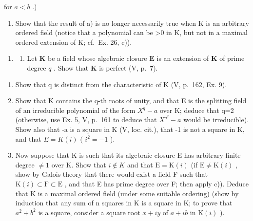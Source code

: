 for \(a < b\) .)

\begin{enumerate}
\def\labelenumi{\alph{enumi})}
\setcounter{enumi}{1}
\tightlist
\item
  Show that the result of a) is no longer necessarily true when K is an arbitrary ordered field (notice that a polynomial can be \textgreater0 in K, but not in a maximal ordered extension of K; cf.~Ex. 26, c)).
\end{enumerate}

\begin{enumerate}
\def\labelenumi{\arabic{enumi})}
\setcounter{enumi}{30}
\tightlist
\item
  \begin{enumerate}
  \def\labelenumii{\alph{enumii})}
  \tightlist
  \item
    Let \(\mathbf{K}\) be a field whose algebraic closure \(\mathbf{E}\) is an extension of \(\mathbf{K}\) of prime degree \(q\) . Show that \(\mathbf{K}\) is perfect (V, p.~7).
  \end{enumerate}
\end{enumerate}

\begin{enumerate}
\def\labelenumi{\alph{enumi})}
\setcounter{enumi}{1}
\item
  Show that q is distinct from the characteristic of K (V, p.~162, Ex. 9).
\item
  Show that K contains the q-th roots of unity, and that E is the splitting field of an irreducible polynomial of the form \(X^{q}-a\) over K; deduce that q=2 (otherwise, use Ex. 5, V, p.~161 to deduce that \(X^{q^{2}}-a\) would be irreducible). Show also that -a is a square in K (V, loc. cit.), that -1 is not a square in K, and that \(E = K(i)\) ( \(i^{2} = -1\) ).
\item
  Now suppose that K is such that its algebraic closure E has arbitrary finite degree \(\neq1\) over K. Show that \(i\notin K\) and that \(\mathrm{E}=\mathrm{K}(i)\) (if \(\mathrm{E}\neq\mathrm{K}(i)\) , show by Galois theory that there would exist a field F such that \(\mathrm{K}(i)\subset\mathrm{F}\subset\mathrm{E}\) , and that E has prime degree over F; then apply c)). Deduce that K is a maximal ordered field (under some suitable ordering) (show by induction that any sum of n squares in K is a square in K; to prove that \(a^{2}+b^{2}\) is a square, consider a square root \(x+iy\) of \(a+ib\) in \(\mathrm{K}(i)\) ).
\end{enumerate}

